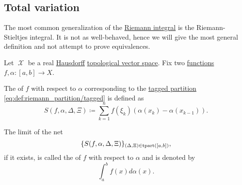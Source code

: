 \subsection{Total variation}\label{subsec:total_variation}

\begin{definition}\label{def:riemann_stieltjes_integral}
  The most common generalization of the \hyperref[def:riemann_integral]{Riemann integral} is the Riemann-Stieltjes integral. It is not as well-behaved, hence we will give the most general definition and not attempt to prove equivalences.

  Let \( \mscrX \) be a real \hyperref[def:separation_axioms/T2]{Hausdorff} \hyperref[def:topological_vector_space]{topological vector space}. Fix two \hyperref[def:function]{functions} \( f, \alpha: [a, b] \to X \).

  The  of \( f \) with respect to \( \alpha \) corresponding to the \hyperref[def:riemann_partition/tagged]{tagged partition} \eqref{eq:def:riemann_partition/tagged} is defined as
  \begin{equation*}
    S(f, \alpha, \Delta, \Xi) \coloneqq \sum_{k=1}^n f(\xi_k) (\alpha(x_k) - \alpha(x_{k-1})).
  \end{equation*}

  The limit of the net
  \begin{equation}\label{eq:def:riemann_stieltjes_integral/net}
    \{ S(f, \alpha, \Delta, \Xi) \}_{(\Delta, \Xi) \in \operatorname{tpart}([a, b])},
  \end{equation}
  if it exists, is called the  of \( f \) with respect to \( \alpha \) and is denoted by
  \begin{equation*}
    \int_a^b f(x) d \alpha(x).
  \end{equation*}
\end{definition}
